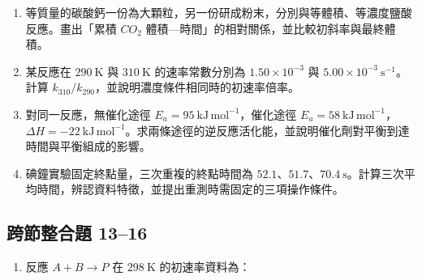 \documentclass[11pt,a4paper]{article}
\providecommand{\tightlist}{%
  \setlength{\itemsep}{0pt}\setlength{\parskip}{0pt}}
\begin{document}
\begin{enumerate}
  \[
  \begin{aligned}
  A+X&\longrightarrow I &&\text{（慢）},\\
  I+B&\longrightarrow P+X &&\text{（快）}.
  \end{aligned}
  \]

  寫出總反應、辨認中間體與催化劑，並由慢速基本步驟寫出預測速率律。
\item
  等質量的碳酸鈣一份為大顆粒，另一份研成粉末，分別與等體積、等濃度鹽酸反應。畫出「累積 \(CO_2\) 體積---時間」的相對關係，並比較初斜率與最終體積。
\item
  某反應在 \(290\ \mathrm K\) 與 \(310\ \mathrm K\) 的速率常數分別為 \(1.50\times10^{-3}\) 與 \(5.00\times10^{-3}\ \mathrm{s^{-1}}\)。計算 \(k_{310}/k_{290}\)，並說明濃度條件相同時的初速率倍率。
\item
  對同一反應，無催化途徑 \(E_a=95\ \mathrm{kJ\,mol^{-1}}\)，催化途徑 \(E_a=58\ \mathrm{kJ\,mol^{-1}}\)，\(\Delta H=-22\ \mathrm{kJ\,mol^{-1}}\)。求兩條途徑的逆反應活化能，並說明催化劑對平衡到達時間與平衡組成的影響。
\item
  碘鐘實驗固定終點量，三次重複的終點時間為 \(52.1\)、\(51.7\)、\(70.4\ \mathrm s\)。計算三次平均時間，辨認資料特徵，並提出重測時需固定的三項操作條件。
\end{enumerate}

\subsection{跨節整合題 13--16}\label{ux8de8ux7bc0ux6574ux5408ux984c-1316}

\begin{enumerate}
\def\labelenumi{\arabic{enumi}.}
\setcounter{enumi}{12}
\tightlist
\item
  反應 \(A+B\rightarrow P\) 在 \(298\ \mathrm K\) 的初速率資料為：
\end{enumerate}
\end{document}
